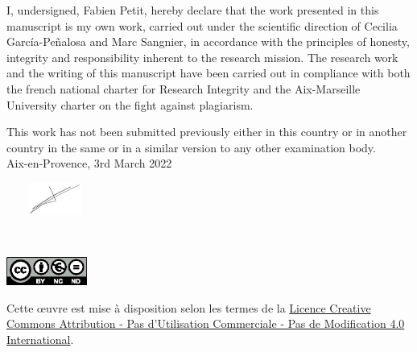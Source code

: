     I, undersigned, Fabien Petit, hereby declare that the work presented in this manuscript is my own work, carried out under the scientific direction of Cecilia García-Peñalosa and Marc Sangnier, in accordance with the principles of honesty, integrity and responsibility inherent to the research mission. The research work and the writing of this manuscript have been carried out in compliance with both the french national charter for Research Integrity and the Aix-Marseille University charter on the fight against plagiarism.
    
    This work has not been submitted previously either in this country or in another country in the same or in a similar version to any other examination body.\\
    
    Aix-en-Provence, 3rd March 2022
    
    \begin{flushright}\includegraphics[width=120px,height=40px]{logo/signature200.png}\end{flushright} %

~\vfill
\begin{center}
	\begin{minipage}[c]{0.25\linewidth}
		\includegraphics[height=35px]{logo/by-nc-nd-eu}
	\end{minipage}\hfill
\end{center}

Cette \oe{}uvre est mise à disposition selon les termes de la \href{https://creativecommons.org/licenses/by-nc-nd/4.0/deed.fr}{Licence Creative Commons Attribution - Pas d’Utilisation Commerciale - Pas de Modification 4.0 International}.
